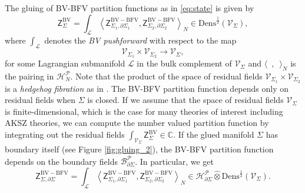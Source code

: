 \documentclass[11pt,colorinlistoftodos]{amsart}
\numberwithin{equation}{subsection}
\theoremstyle{plain}
\theoremstyle{definition}
\theoremstyle{remark}
\newcommand{\C}{\mathbb{C}}
\newcommand{\de}{\partial}
\newcommand{\calB}{\mathcal{B}}
\newcommand{\calH}{\mathcal{H}}
\newcommand{\calL}{\mathcal{L}}
\newcommand{\calP}{\mathcal{P}}
\newcommand{\calV}{\mathcal{V}}
\begin{document}
The gluing of BV-BFV partition functions as in \eqref{eq:state} is given by 
\begin{equation}
\label{eq:BV-BFV_gluing}
\mathsf{Z}^{\scriptscriptstyle\mathrm{BV}}_{\Sigma}=\int_{\mathcal{L}} \left\langle\mathsf{Z}^{\scriptscriptstyle\mathrm{BV-BFV}}_{\Sigma_1,\de\Sigma_1},\mathsf{Z}^{\scriptscriptstyle\mathrm{BV-BFV}}_{\Sigma_2,\de\Sigma_2}\right\rangle_N\in\mathrm{Dens}^\frac{1}{2}(\calV_\Sigma),
\end{equation}
where $\int_\mathcal{L}$ denotes the \emph{BV pushforward} with respect to the map 
\[
\calV_{\Sigma_1}\times\calV_{\Sigma_2}\to \calV_\Sigma, 
\]
for some Lagrangian submanifold $\calL$ in the bulk complement of $\calV_\Sigma$ and $\langle\enspace,\enspace\rangle_N$ is the pairing in $\calH^\calP_N$. 
Note that the product of the space of residual fields $\calV_{\Sigma_1}\times\calV_{\Sigma_2}$ is a \emph{hedgehog fibration} as in \cite{CMR2}. The BV-BFV partition function depends only on residual fields when $\Sigma$ is closed. If we assume that the space of residual fields $\calV_\Sigma$ is finite-dimensional, which is the case for many theories of interest including AKSZ theories, we can compute the number valued partition function by integrating out the residual fields $\int_{\calV_\Sigma}\mathsf{Z}^{\scriptscriptstyle\mathrm{BV}}_{\Sigma}\in\C$. 
If the glued manifold $\Sigma$ has boundary itself (see Figure \ref{fig:gluing_2}), the BV-BFV partition function depends on the boundary fields $\calB^\calP_{\de\Sigma}$. In particular, we get 
\[
\mathsf{Z}^{\scriptscriptstyle\mathrm{BV-BFV}}_{\Sigma,\de\Sigma}=\int_{\mathcal{L}} \left\langle\mathsf{Z}^{\scriptscriptstyle\mathrm{BV-BFV}}_{\Sigma_1,\de\Sigma_1},\mathsf{Z}^{\scriptscriptstyle\mathrm{BV-BFV}}_{\Sigma_2,\de\Sigma_2}\right\rangle_N\in \calH^\calP_{\de\Sigma}\widehat{\otimes}\mathrm{Dens}^\frac{1}{2}(\calV_\Sigma).
\]

\end{document}
